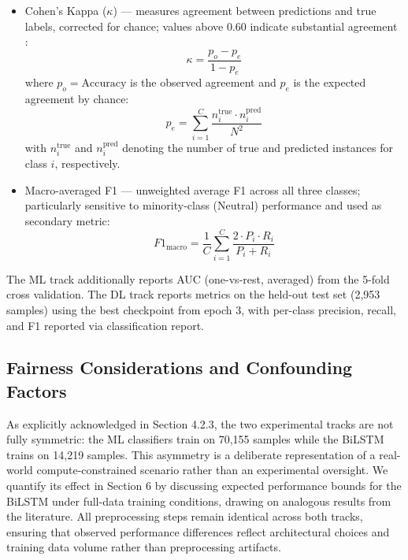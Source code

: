 \documentclass{article}
\begin{document}
\begin{itemize}
\item {Cohen's Kappa} ($\kappa$) \cite{cohen1960kappa} --- measures agreement between predictions and true labels, corrected for chance; values above 0.60 indicate substantial agreement \cite{cohen1960kappa}:
\begin{equation}
    \kappa = \frac{p_o - p_e}{1 - p_e}
\end{equation}
where $p_o = \text{Accuracy}$ is the observed agreement and $p_e$ is the expected agreement by chance:
\begin{equation}
    p_e = \sum_{i=1}^{C} \frac{n_i^{\text{true}} \cdot n_i^{\text{pred}}}{N^2}
\end{equation}
with $n_i^{\text{true}}$ and $n_i^{\text{pred}}$ denoting the number of true and predicted instances for class $i$, respectively.

\item {Macro-averaged F1} --- unweighted average F1 across all three classes; particularly sensitive to minority-class (Neutral) performance and used as secondary metric:
\begin{equation}
    F1_{\text{macro}} = \frac{1}{C} \sum_{i=1}^{C} \frac{2 \cdot P_i \cdot R_i}{P_i + R_i}
\end{equation}

\end{itemize}

The ML track additionally reports AUC (one-vs-rest, averaged) from the 5-fold cross validation. The DL track reports metrics on the held-out test set (2,953 samples) using the best checkpoint from epoch 3, with per-class precision, recall, and F1 reported via classification report.

\subsection{Fairness Considerations and Confounding Factors}
As explicitly acknowledged in Section 4.2.3, the two experimental tracks are not fully symmetric: the ML classifiers train on 70,155 samples while the BiLSTM trains on 14,219 samples. This asymmetry is a deliberate representation of a real-world compute-constrained scenario rather than an experimental oversight. We quantify its effect in Section 6 by discussing expected performance bounds for the BiLSTM under full-data training conditions, drawing on analogous results from the literature. All preprocessing steps remain identical across both tracks, ensuring that observed performance differences reflect architectural choices and training data volume rather than preprocessing artifacts.
\end{document}
